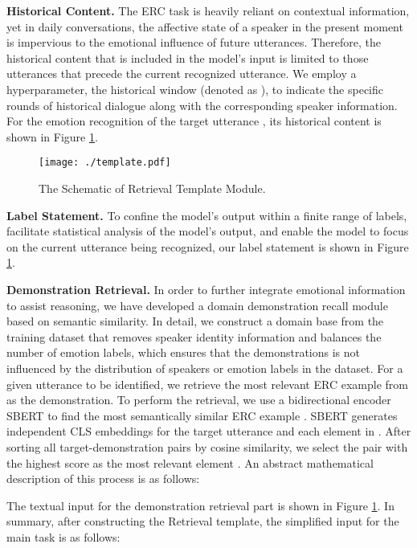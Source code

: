 \documentclass[conference]{IEEEtran}
\begin{document}
\textbf{Historical Content.} The ERC task is heavily reliant on contextual information, yet in daily conversations, the affective state of a speaker in the present moment is impervious to the emotional influence of future utterances. Therefore, the historical content that is included in the model's input is limited to those utterances that precede the current recognized utterance. We employ a hyperparameter, the historical window (denoted as ), to indicate the specific rounds of historical dialogue along with the corresponding speaker information. For the emotion recognition of the target utterance , its historical content  is shown in Figure \ref{fig2}.
\begin{figure}[t]
\centering
\texttt{[image: ./template.pdf]} \caption{The Schematic of Retrieval Template Module.}
\vspace{-0.1cm}
\label{fig2}
\end{figure}

\textbf{Label Statement.} To confine the model's output within a finite range of labels, facilitate statistical analysis of the model's output, and enable the model to focus on the current utterance being recognized, our label statement  is shown in Figure \ref{fig2}. 


\textbf{Demonstration Retrieval.}
In order to further integrate emotional information to assist reasoning, we have developed a domain demonstration recall module based on semantic similarity. In detail, we construct a domain base  from the training dataset that removes speaker identity information and balances the number of emotion labels, which ensures that the demonstrations is not influenced by the distribution of speakers or emotion labels in the dataset. For a given utterance  to be identified, we retrieve the most relevant ERC example from  as the demonstration. To perform the retrieval, we use a bidirectional encoder SBERT \cite{reimers2019sentence} to find the most semantically similar ERC example . SBERT generates independent CLS embeddings for the target utterance  and each element  in . After sorting all target-demonstration pairs by cosine similarity, we select the pair with the highest score as the most relevant element . An abstract mathematical description of this process is as follows:

The textual input  for the demonstration retrieval part is shown in Figure \ref{fig2}.
In summary, after constructing the Retrieval template, the simplified input  for the main task is as follows:
\end{document}
